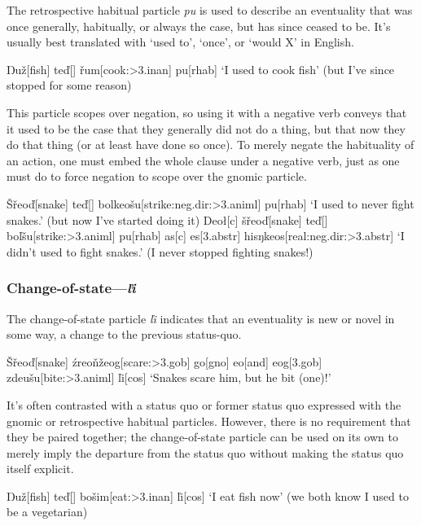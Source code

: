 \documentclass[a4paper,11pt,oneside,openany]{memoir}
\newcommand{\vd}{ď}
\newcommand{\vz}{ž}
\newcommand{\vs}{š}
\newcommand{\vr}{ř}
\newcommand{\vl}{ľ}
\newcommand{\vn}{ň}
\newcommand{\vS}{Š}
\newcommand{\Engma}{Ŋ}
\newcommand{\engma}{ŋ}
\begin{document}
The retrospective habitual particle \textit{pu} is used to describe an eventuality that was once generally, habitually, or always the case, but has since ceased to be. It's usually best translated with `used to', `once', or `would X' in English.

\ex 
\begingl
\Engma u\vz[fish]
te\vd[]
\vr um[cook:{\sc >3.inan}]
pu[\sc rhab]
\glft `I used to cook fish' (but I've since stopped for some reason)
\endgl
\xe

This particle scopes over negation, so using it with a negative verb conveys that it used to be the case that they generally did not do a thing, but that now they do that thing (or at least have done so once). To merely negate the habituality of an action, one must embed the whole clause under a negative verb, just as one must do to force negation to scope over the gnomic particle.

\pex 
\a
\begingl 
\vS\vr eo\vd[snake]
te\vd[]
bolkeo\vs u[strike:{\sc neg.dir:>3.animl}]
pu[\sc rhab]
\glft `I used to never fight snakes.' (but now I've started doing it)
\endgl 
\a
\begingl
Deo\l[\sc c]
\vs\vr eo\vd[snake]
te\vd[]
bo\vl\vs u[strike:{\sc >3.animl}]
pu[\sc rhab]
\nogloss{,}
as[\sc c]
es[\sc 3.abstr]
his\engma keos[real:{\sc neg.dir:>3.abstr}]
\glft `I didn't used to fight snakes.' (I never stopped fighting snakes!)
\endgl 
\xe

\subsubsection{Change-of-state---\textit{\vl i}}

The change-of-state particle \textit{\vl i} indicates that an eventuality is new or novel in some way, a change to the previous status-quo. 

\ex
\begingl
\vS\vr eo\vd[snake]
\'zreo\vn\vz eog[scare:{\sc >3.gob}]
go[\sc gno]
eo[and]
eog[\sc 3.gob]
zdeu\vs u[bite:{\sc >3.animl}]
\vl i[\sc cos]
\glft `Snakes scare him, but he bit (one)!'
\endgl
\xe

It's often contrasted with a status quo or former status quo expressed with the gnomic or retrospective habitual particles. However, there is no requirement that they be paired together; the change-of-state particle can be used on its own to merely imply the departure from the status quo without making the status quo itself explicit.

\ex
\begingl
\Engma u\vz[fish]
te\vd[]
bo\vs im[eat:{\sc >3.inan}]
\vl i[\sc cos]
\glft `I eat fish now' (we both know I used to be a vegetarian)
\endgl
\xe
\end{document}
